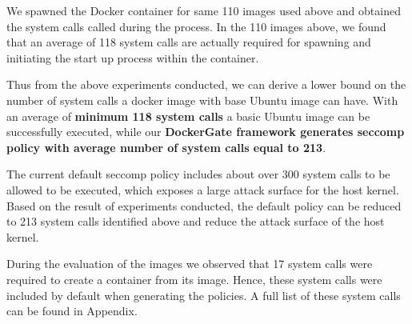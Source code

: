 We spawned the Docker container for same 110 images used above and obtained the system calls called during the process. In the 110 images above, we found that an average of 118 system calls are actually required for spawning and initiating the start up process within the container.

Thus from the above experiments conducted, we can derive a lower bound on the number of system calls a docker image with base Ubuntu image can have. With an average of \textbf{minimum 118 system calls} a basic Ubuntu image can be  successfully executed, while our \textbf{DockerGate framework generates seccomp policy with average number of system calls equal to 213}. 

The current default seccomp policy includes about over 300 system calls to be allowed to be executed, which exposes a large attack surface for the host kernel. Based on the result of experiments conducted, the default policy can be reduced to 213 system calls identified above and reduce the attack surface of the host kernel. 

During the evaluation of the images we observed that 17 system calls were required to create a container from its image. Hence, these system calls were included by default when generating the policies. A full list of these system calls can be found in Appendix.